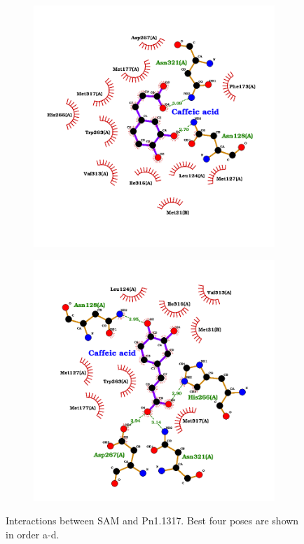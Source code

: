 \documentclass[12pt]{article}
\begin{document}
\begin{figure}[h!]
\begin{subfigure}[h!]{0.35\textwidth}
			\caption{}
		\end{subfigure}
		\hfill
		\begin{subfigure}[h!]{0.35\textwidth}
			\hspace{2cm}
			\includegraphics[width=\textwidth]{../4/Dock/Dock2/best3.png}
			\caption{}
		\end{subfigure}
		\hfill
		\begin{subfigure}[h!]{0.35\textwidth}
			\hspace{-2cm}
			\includegraphics[width=\textwidth]{../4/Dock/Dock2/best4.png}
			\caption{}
		\end{subfigure}
		\hfill
		\caption[Interactions between caffeic acid and SAM-Pn1.1317 complex.]{Interactions between SAM and Pn1.1317. Best four poses are shown in order a-d.}
		\label{fig4_9}
	\end{figure}
\end{document}
